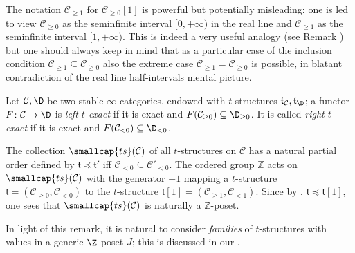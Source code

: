 \documentclass[11pt, a4paper]{amsart}
\newcommand{\tee}{\mathfrak{t}}
\newcommand{\ts}{\smallcap{ts}}
\renewcommand{\C}{\mathcal{C}}
\begin{document}
\begin{remark}
\marginnote{\textdbend} 
The notation $\C_{\geq 1}$ for $\C_{\geq 0}[1]$ is powerful but potentially misleading: one is led to view $\C_{\geq 0}$ as the seminfinite interval $[0,+\infty)$ in the real line and $\C_{\geq 1}$ as the seminfinite interval $[1,+\infty)$. This is indeed a very useful analogy (see Remark ) but one should always keep in mind that as a particular case of the inclusion condition $\C_{\geq 1}\subseteq \C_{\geq 0}$ also the extreme case $\C_{\geq 1}=\C_{\geq 0}$ is possible, in blatant contradiction of the real line half-intervals mental picture.
\end{remark}
\begin{definition}\label{t.exact.func}
Let $\C,\D$ be two stable $\infty$-categories, endowed with $t$-structures $\tee_\C,\tee_\D$; a functor $F\colon \C \to \D$ is \emph{left $t$-exact} if it is exact and $F(\C_{\ge 0})\subseteq \D_{\ge 0}$. It is called \emph{right $t$-exact} if it is exact and $F(\C_{< 0})\subseteq \D_{< 0}$.
\end{definition}
\begin{remark}\label{slicing}
The collection $\ts(\C)$ of all $t$-structures on $\C$ has a natural partial order defined by $\tee\preceq \tee'$ iff $\C_{<0}\subseteq \C'_{<0}$. The ordered group $\mathbb{Z}$ acts on $\ts(\C)$ with the generator $+1$ mapping a $t$-structure $\tee=(\C_{\geq0},\C_{<0})$ to the $t$-structure $\tee[1]=(\C_{\geq 1},\C_{<1})$. Since by . $\tee\preceq\tee[1]$, one sees that $\ts(\C)$ is naturally a $\mathbb{Z}$-poset.
\end{remark}
In light of this remark, it is natural to consider \emph{families} of $t$-structures with values in a generic $\Z$-poset $J$; this is discussed in our \achap {}.
\end{document}
